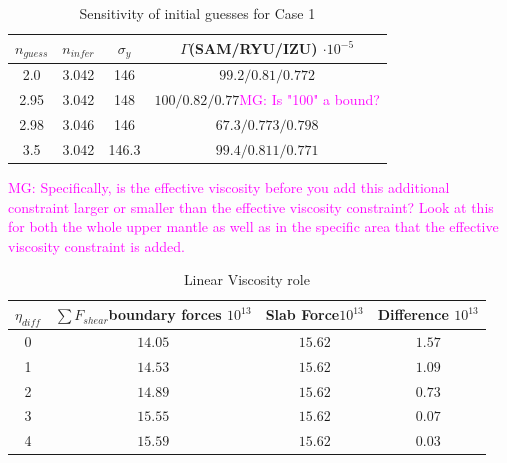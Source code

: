 \documentclass[12pt]{article}
\newcommand{\mgnote}[1]{\textcolor{magenta}{MG: #1}}
\begin{document}
{\begin{table}[H]
		\caption{Sensitivity of initial guesses for Case 1} %
		\centering  %
		\begin{tabular}{ c c c c } %
		\hline \hline                        %
		 $n_{guess}$ &$n_{infer}$ &$\sigma_y$&$\Gamma $(SAM/RYU/IZU) $\cdot 10^{-5}$   \\ [0.5ex] %
		\hline                  %
        	 2.0 &3.042 & 146 & $99.2/0.81/0.772$   \\
	         2.95 &3.042 & 148 & $100/0.82/0.77$\mgnote{Is "100" a bound?}    \\
	         2.98 &3.046 & 146 & $67.3/0.773/0.798$  \\
	        3.5 &3.042 & 146.3 & $99.4/0.811/0.771$  \\             
                \hline %
		\end{tabular}
		\label{table:initial_guess} %
		\end{table}
\mgnote{Specifically, is the effective viscosity before you add this additional constraint larger or smaller than the effective viscosity constraint? Look at this for both the whole upper mantle as well as in the specific area that the effective viscosity constraint is added.}



\begin{table}[H]
		\caption{Linear Viscosity role} %
		\centering  %
		\begin{tabular}{c c c  c} %
		\hline \hline                        %
		$\eta_{diff}$&$\sum F_{shear}$boundary forces $10^{13}$& Slab Force$10^{13}$ & Difference $10^{13}$   \\ [0.5ex] %
		\hline                  %
        	0 & $14.05 $&$15.62$ & $1.57$   \\
        	1 & $14.53$&$15.62$ & $1.09$   \\
	        2 & $14.89$&$15.62$ & $0.73$   \\
	        3 & $15.55$&$15.62$ & $0.07$   \\
	        4 & $15.59$&$15.62$ & $0.03$   \\
 
                \hline %
		\end{tabular}
		\label{table:parameters} %
		\end{table}



}
\end{document}
